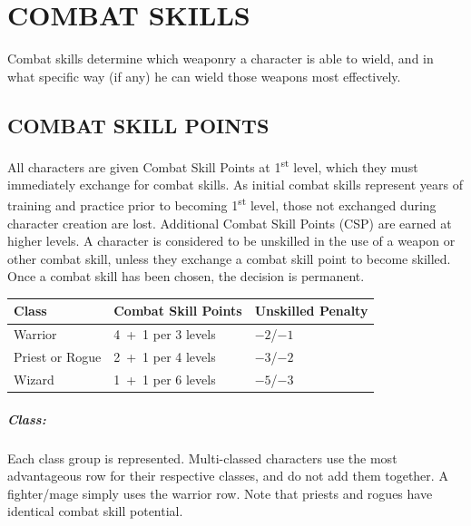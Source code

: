 \chapter{COMBAT SKILLS}

\begin{multicols}{2}

Combat skills determine which weaponry a character is able to wield, and in what specific way (if any) he can wield those weapons most effectively.

\section{COMBAT SKILL POINTS}

All characters are given Combat Skill Points at 1\textsuperscript{st} level, which they must immediately exchange for combat skills.  As initial combat skills represent years of training and practice prior to becoming 1\textsuperscript{st} level, those not exchanged during character creation are lost.  Additional Combat Skill Points (CSP) are earned at higher levels.  A character is considered to be unskilled in the use of a weapon or other combat skill, unless they exchange a combat skill point to become skilled.  Once a combat skill has been chosen, the decision is permanent.

\noindent
\begin{minipage}{\columnwidth}

\label{classCSP}
\noindent
\begin{tabular}{|p{}|p{}|p{}|}
\hline
Class		& Combat Skill Points	& Unskilled Penalty \\
\hline\hline
\rowcolor[gray]{.9}Warrior			& 4~+~1 per 3 levels	& $-2$/$-1$ \\
Priest or Rogue	& 2~+~1 per 4 levels	& $-3$/$-2$ \\
\rowcolor[gray]{.9}Wizard			& 1~+~1 per 6 levels	& $-5$/$-3$ \\
\hline
\end{tabular}

\end{minipage}

\paragraph{Class:} Each class group is represented.  Multi-classed characters use the most advantageous row for their respective classes, and do not add them together.  A fighter/mage simply uses the warrior row.  Note that priests and rogues have identical combat skill potential.


\end{multicols}
